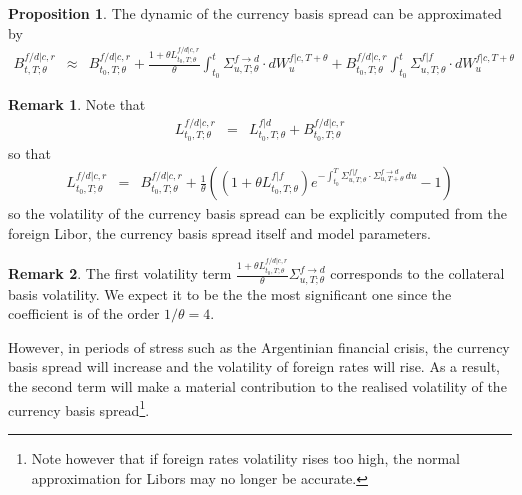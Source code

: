 \documentclass[11pt,english]{amsart}
\theoremstyle{definition}
\newtheorem{prop}{Proposition}
\newtheorem{rema}{Remark}
\begin{document}
\begin{prop}
The dynamic of the currency basis spread can be approximated by 
\begin{eqnarray}
  B^{f/d|c,r}_{t,T;\theta} 
  &\approx& B^{f/d|c,r}_{t_0,T;\theta} 
  +  \frac{1+\theta L^{f/d|c,r}_{t_0,T;\theta}}{\theta} \int_{t_0}^t \Sigma^{f\to d}_{u,T;\theta} \cdot dW^{f|c,T+\theta}_{u} 
  + B^{f/d|c,r}_{t_0,T;\theta} \int_{t_0}^t \Sigma^{f|f}_{u,T;\theta}  \cdot dW^{f|c,T+\theta}_{u}  
\end{eqnarray} 

\end{prop}


\begin{rema}
Note that 
\begin{eqnarray}
  L^{f/d|c,r}_{t_0,T;\theta} 
  &=& L^{f|d}_{t_0,T;\theta} + B^{f/d|c,r}_{t_0,T;\theta}  
\end{eqnarray} 
so that 
\begin{eqnarray}
  L^{f/d|c,r}_{t_0,T;\theta} 
  &=& B^{f/d|c,r}_{t_0,T;\theta} + \frac{1}{\theta}\left( (1+\theta L^{f|f}_{t_0,T;\theta}) e^{- \int_{t_0}^T \Sigma^{f|f}_{u,T;\theta} \cdot \Sigma^{f\to d}_{u,T+\theta} \, du} - 1 \right)
\end{eqnarray} 
so the volatility of the currency basis spread can be explicitly computed from the foreign Libor, the currency basis spread itself and model parameters.
\end{rema}


\begin{rema}
The first volatility term $ \frac{1+\theta L^{f/d|c,r}_{t_0,T;\theta}}{\theta}  \Sigma^{f\to d}_{u,T;\theta}$ corresponds to the collateral basis volatility. We expect it to be the the most significant one since the coefficient is of the order $1/\theta = 4$. 

However, in periods of stress such as the Argentinian financial crisis, the currency basis spread will increase and the volatility of foreign rates will rise. As a result, the second term will make a material contribution to the realised volatility of the currency basis spread\footnote{Note however that if foreign rates volatility rises too high, the normal approximation for Libors may no longer be accurate.}. 
\end{rema}
\end{document}
